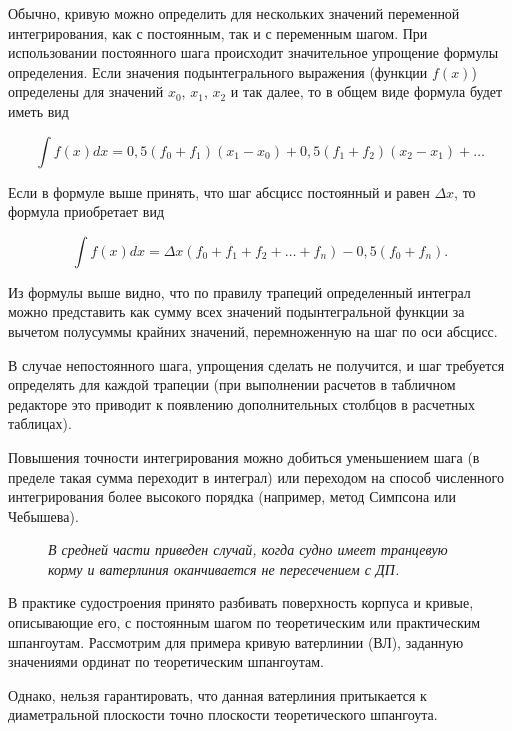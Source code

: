 Обычно, кривую можно определить для нескольких значений переменной интегрирования, как с постоянным, так и с переменным шагом.
При использовании постоянного шага происходит значительное упрощение формулы определения.
Если значения подынтегрального выражения (функции $f(x)$) определены для значений $x_0$, $x_1$, $x_2$ и так далее, то в общем виде формула будет иметь вид

\begin{equation}
    \int f(x) dx = 0{,}5 (f_0 + f_1)(x_1 - x_0) + 0{,}5(f_1 + f_2)(x_2 - x_1)+ \dots
\end{equation}

Если в формуле выше принять, что шаг абсцисс постоянный и равен $\Delta x$, то формула приобретает вид

\begin{equation}
    \int f(x) dx = \Delta x (f_0 + f_1 + f_2 + \dots + f_n) - 0{,}5(f_0 + f_n).
\end{equation}

Из формулы выше видно, что по правилу трапеций определенный интеграл можно представить как сумму всех значений подынтегральной функции за вычетом полусуммы крайних значений, перемноженную на шаг по оси абсцисс.

В случае непостоянного шага, упрощения сделать не получится, и шаг требуется определять для каждой трапеции (при выполнении расчетов в табличном редакторе это приводит к появлению дополнительных столбцов в расчетных таблицах).

Повышения точности интегрирования можно добиться уменьшением шага (в пределе такая сумма переходит в интеграл) или переходом на способ численного интегрирования более высокого порядка (например, метод Симпсона или Чебышева).

\begin{figure}[h!]
    \centerline{}
    \caption{Учет истинного притыкания ватерлинии к ДП}
    \caption*{\textit{ В средней части приведен случай, когда судно имеет транцевую корму и ватерлиния оканчивается не пересечением с ДП.}}
\end{figure}

В практике судостроения принято разбивать поверхность корпуса и кривые, описывающие его, с постоянным шагом по теоретическим или практическим шпангоутам.
Рассмотрим для примера кривую ватерлинии (ВЛ), заданную значениями ординат по теоретическим шпангоутам.

Однако, нельзя гарантировать, что данная ватерлиния притыкается к диаметральной плоскости точно плоскости теоретического шпангоута.

